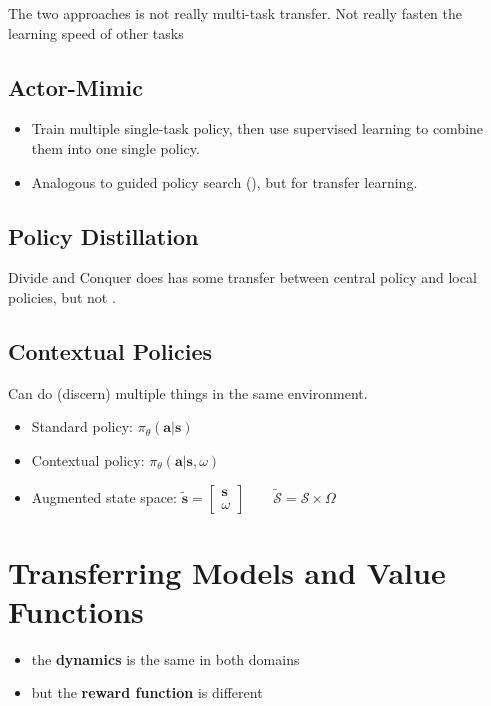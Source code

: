 The two approaches is not really multi-task transfer. Not really fasten the learning speed of other tasks
\subsection{Actor-Mimic}
\begin{itemize}
	\item Train multiple single-task policy, then use supervised learning to combine them into one single policy. \cite{rusu2015policy}
	\item Analogous to guided policy search (), but for transfer learning. \cite{levine2013icml}
\end{itemize}

\subsection{Policy Distillation}
Divide and Conquer does has some transfer between central policy and local policies, but not . \cite{parisotto2015actor}

\subsection{Contextual Policies}
Can do (discern) multiple things in the same environment.
\begin{itemize}
	\item Standard policy: $\pi_\theta(\textbf{a|s})$
	\item Contextual policy: $\pi_\theta(\textbf{a|s}, \omega)$
	\item Augmented state space: $\tilde{\textbf{s}} = \begin{bmatrix}
		\textbf{s}\\
		\omega
	\end{bmatrix} \qquad \tilde{\mathcal{S}} = \mathcal{S} \times \Omega$
\end{itemize}

\section{Transferring Models and Value Functions}
\begin{itemize}
	\item the \textbf{dynamics} is the same in both domains
	\item but the \textbf{reward function} is different
\end{itemize}

